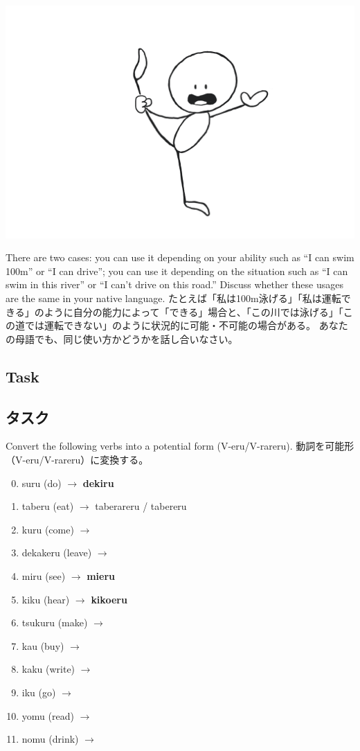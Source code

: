 \documentclass[uplatex,dvipdfmx,b5paper,english,10pt]{jsbook}
\begin{document}
\begin{center}
\includegraphics[trim=110 20 100 40, clip, width=.18\hsize]{img/dekiru.png}
\end{center}

\begin{toianswer}
\ifEnglish
There are two cases: you can use it depending on your ability such as ``I can swim 100m'' or ``I can drive'';  you can use it depending on the situation such as ``I can swim in this river'' or ``I can't drive on this road.''
Discuss whether these usages are the same in your native language.
\else
たとえば「私は100m泳げる」「私は運転できる」のように自分の能力によって「できる」場合と、「この川では泳げる」「この道では運転できない」のように状況的に可能・不可能の場合がある。
あなたの母語でも、同じ使い方かどうかを話し合いなさい。
\fi
\end{toianswer}

\ifEnglish
\subsection{Task}
\else
\subsection{タスク}
\fi

\begin{toiquestion}
\ifEnglish
Convert the following verbs into a potential form (V-eru/V-rareru).
\else
動詞を可能形（V-eru/V-rareru）に変換する。
\fi
\end{toiquestion}

\begin{multicols}{2}
 \begin{enumerate}
 \setcounter{enumi}{-1}
 \item suru (do)        $\rightarrow$ {\bfseries dekiru}
 \item taberu (eat)     $\rightarrow$ taberareru / tabereru \hrulefill
 \item kuru (come)      $\rightarrow$ \hrulefill
 \item dekakeru (leave) $\rightarrow$ \hrulefill
 \item miru (see)       $\rightarrow$ {\bfseries mieru}
 \item kiku (hear)      $\rightarrow$ {\bfseries kikoeru}
 \item tsukuru (make)   $\rightarrow$ \hrulefill
 \item kau (buy)        $\rightarrow$ \hrulefill
 \item kaku (write)     $\rightarrow$ \hrulefill
 \item iku (go)         $\rightarrow$ \hrulefill
 \item yomu (read)      $\rightarrow$ \hrulefill
 \item nomu (drink)     $\rightarrow$ \hrulefill
 \end{enumerate}
\end{multicols}
\end{document}
